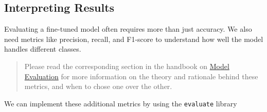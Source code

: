 \documentclass[
  letterpaper,
  DIV=11,
  numbers=noendperiod]{scrreprt}
\begin{document}
\subsection{Interpreting Results}\label{interpreting-results}

Evaluating a fine-tuned model often requires more than just accuracy. We
also need metrics like precision, recall, and F1-score to understand how
well the model handles different classes.

\begin{quote}
Please read the corresponding section in the handbook on
\href{./model_evaluation.qmd}{Model Evaluation} for more information on
the theory and rationale behind these metrics, and when to chose one
over the other.
\end{quote}

We can implement these additional metrics by using the \texttt{evaluate}
library
\end{document}
